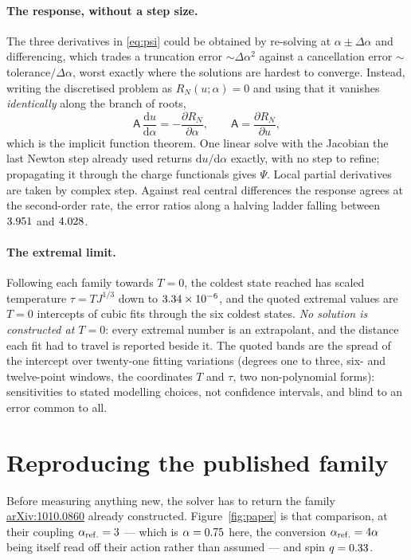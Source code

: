 \documentclass[10pt,a4paper]{article}
\newcommand{\dd}{\mathrm{d}}
\newcommand{\aX}[1]{\href{https://arxiv.org/abs/#1}{arXiv:#1}}
\begin{document}
\paragraph{The response, without a step size.}
The three derivatives in \eqref{eq:psi} could be obtained by re-solving at
$\alpha\pm\Delta\alpha$ and differencing, which trades a truncation error
$\sim\Delta\alpha^2$ against a cancellation error $\sim$ tolerance$/\Delta\alpha$,
worst exactly where the solutions are hardest to converge. Instead, writing the discretised
problem as $R_N(u;\alpha)=0$ and using that it vanishes \emph{identically}
along the branch of roots,
\begin{equation}
 \mathsf A\,\frac{\dd u}{\dd\alpha}=-\frac{\partial R_N}{\partial\alpha},
 \qquad \mathsf A=\frac{\partial R_N}{\partial u},
 \label{eq:response}
\end{equation}
which is the implicit function theorem. One linear solve with the Jacobian the
last Newton step already used returns $\dd u/\dd\alpha$ exactly, with no step to
refine; propagating it through the charge functionals gives $\Psi$. Local
partial derivatives are taken by complex step. Against real central differences
the response agrees at the second-order rate, the error ratios along a halving
ladder falling between $3.951$ and $4.028$.

\paragraph{The extremal limit.}
Following each family towards $T=0$, the coldest state reached has scaled
temperature $\tau=TJ^{1/3}$ down to $3.34\times 10^{-6}$, and the quoted extremal values
are $T=0$ intercepts of cubic fits through the six coldest states. \emph{No
solution is constructed at $T=0$}: every extremal number is an extrapolant, and
the distance each fit had to travel is reported beside it. The quoted bands are
the spread of the intercept over twenty-one fitting variations (degrees one to
three, six- and twelve-point windows, the coordinates $T$ and $\tau$, two
non-polynomial forms): sensitivities to stated modelling choices, not confidence
intervals, and blind to an error common to all.

\section*{Reproducing the published family}

Before measuring anything new, the solver has to return the family
\aX{1010.0860} already constructed. Figure~\ref{fig:paper} is that comparison, at their
coupling $\alpha_{\rm ref.}=3$ --- which is $\alpha=0.75$ here,
the conversion $\alpha_{\rm ref.}=4\alpha$ being itself read off their action
rather than assumed --- and spin $q=0.33$.
\end{document}

